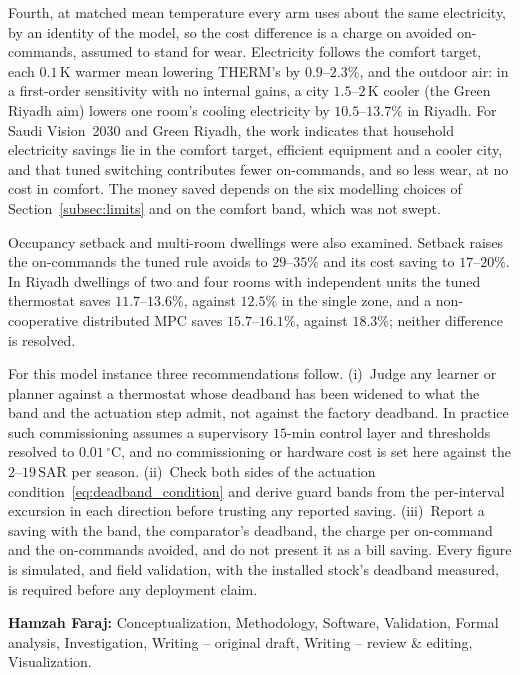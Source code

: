 \documentclass[pdflatex,sn-mathphys-num,iicol]{sn-jnl}
\theoremstyle{thmstyleone}\newtheorem{proposition}{Proposition}\newtheorem{corollary}{Corollary}
\theoremstyle{thmstyletwo}\newtheorem{remark}{Remark}\newtheorem{observation}{Observation}
\theoremstyle{thmstylethree}\newtheorem{definition}{Definition}
\newcommand{\SAR}{\text{SAR}}
\begin{document}
Fourth, at matched mean temperature every arm uses about the same electricity, by an identity of the model, so the cost difference is a charge on avoided on-commands, assumed to stand for wear. Electricity follows the comfort target, each $0.1\,$K warmer mean lowering THERM's by $0.9$--$2.3\%$, and the outdoor air: in a first-order sensitivity with no internal gains, a city $1.5$--$2\,$K cooler (the Green Riyadh aim) lowers one room's cooling electricity by $10.5$--$13.7\%$ in Riyadh. For Saudi Vision~2030 and Green Riyadh, the work indicates that household electricity savings lie in the comfort target, efficient equipment and a cooler city, and that tuned switching contributes fewer on-commands, and so less wear, at no cost in comfort. The money saved depends on the six modelling choices of Section~\ref{subsec:limits} and on the comfort band, which was not swept.

Occupancy setback and multi-room dwellings were also examined. Setback raises the on-commands the tuned rule avoids to $29$--$35\%$ and its cost saving to $17$--$20\%$. In Riyadh dwellings of two and four rooms with independent units the tuned thermostat saves $11.7$--$13.6\%$, against $12.5\%$ in the single zone, and a non-cooperative distributed MPC saves $15.7$--$16.1\%$, against $18.3\%$; neither difference is resolved.

For this model instance three recommendations follow. (i)~Judge any learner or planner against a thermostat whose deadband has been widened to what the band and the actuation step admit, not against the factory deadband. In practice such commissioning assumes a supervisory $15$-min control layer and thresholds resolved to $0.01\,^\circ$C, and no commissioning or hardware cost is set here against the $2$--$19\,\SAR$ per season. (ii)~Check both sides of the actuation condition~\eqref{eq:deadband_condition} and derive guard bands from the per-interval excursion in each direction before trusting any reported saving. (iii)~Report a saving with the band, the comparator's deadband, the charge per on-command and the on-commands avoided, and do not present it as a bill saving. Every figure is simulated, and field validation, with the installed stock's deadband measured, is required before any deployment claim.

\backmatter

\textbf{Hamzah Faraj:} Conceptualization, Methodology, Software, Validation, Formal analysis, Investigation, Writing -- original draft, Writing -- review \& editing, Visualization.
\end{document}
